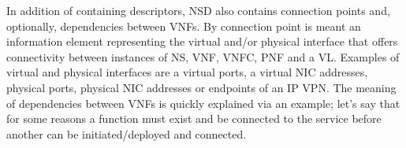 In addition of containing descriptors, NSD also contains connection points and, optionally, dependencies between VNFs. By connection point is meant an information element representing the virtual and/or physical interface that offers connectivity between instances of NS, VNF, VNFC, PNF and a VL. Examples of virtual and physical interfaces are a virtual ports, a virtual NIC addresses, physical ports, physical NIC addresses or endpoints of an IP VPN.
The meaning of dependencies between VNFs is quickly explained via an example; let's say that for some reasons a function must exist and be connected to the service before another can be initiated/deployed and connected.

